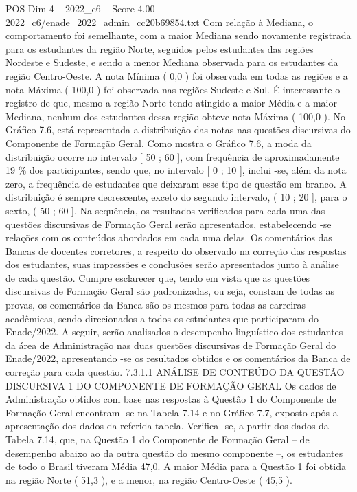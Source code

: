 \begin{textsample}{POS Dim 4 – 2022\_c6 – Score 4.00 – 2022\_c6/enade\_2022\_admin\_cc20b69854.txt}
Com relação à Mediana, o comportamento foi semelhante, com a maior Mediana sendo novamente registrada para os estudantes da região Norte, seguidos pelos estudantes das regiões Nordeste e Sudeste, e sendo a menor Mediana observada para os estudantes da região Centro-Oeste.
A nota Mínima ( 0,0 ) foi observada em todas as regiões e a nota Máxima ( 100,0 ) foi observada nas regiões Sudeste e Sul.
É interessante o registro de que, mesmo a região Norte tendo atingido a maior Média e a maior Mediana, nenhum dos estudantes dessa região obteve nota Máxima ( 100,0 ).
No Gráfico 7.6, está representada a distribuição das notas nas questões discursivas do Componente de Formação Geral.
Como mostra o Gráfico 7.6, a moda da distribuição ocorre no intervalo [ 50 ; 60 ], com frequência de aproximadamente 19 \% dos participantes, sendo que, no intervalo [ 0 ; 10 ], inclui -se, além da nota zero, a frequência de estudantes que deixaram esse tipo de questão em branco.
A distribuição é sempre decrescente, exceto do segundo intervalo, ( 10 ; 20 ], para o sexto, ( 50 ; 60 ].
Na sequência, os resultados verificados para cada uma das questões discursivas de Formação Geral serão apresentados, estabelecendo -se relações com os conteúdos abordados em cada uma delas.
Os comentários das Bancas de docentes corretores, a respeito do observado na correção das respostas dos estudantes, suas impressões e conclusões serão apresentados junto à análise de cada questão.
Cumpre esclarecer que, tendo em vista que as questões discursivas de Formação Geral são padronizadas, ou seja, constam de todas as provas, os comentários da Banca são os mesmos para todas as carreiras acadêmicas, sendo direcionados a todos os estudantes que participaram do Enade/2022.
A seguir, serão analisados o desempenho linguístico dos estudantes da área de Administração nas duas questões discursivas de Formação Geral do Enade/2022, apresentando -se os resultados obtidos e os comentários da Banca de correção para cada questão. 7.3.1.1 ANÁLISE DE CONTEÚDO DA QUESTÃO DISCURSIVA 1 DO COMPONENTE DE FORMAÇÃO GERAL Os dados de Administração obtidos com base nas respostas à Questão 1 do Componente de Formação Geral encontram -se na Tabela 7.14 e no Gráfico 7.7, exposto após a apresentação dos dados da referida tabela.
Verifica -se, a partir dos dados da Tabela 7.14, que, na Questão 1 do Componente de Formação Geral – de desempenho abaixo ao da outra questão do mesmo componente –, os estudantes de todo o Brasil tiveram Média 47,0.
A maior Média para a Questão 1 foi obtida na região Norte ( 51,3 ), e a menor, na região Centro-Oeste ( 45,5 ).

\end{textsample}
